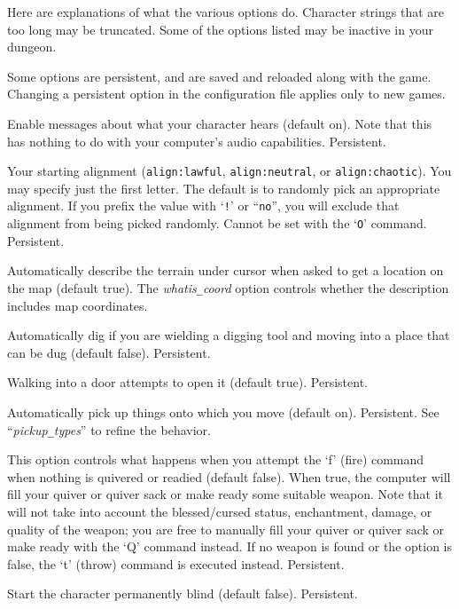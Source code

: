 Here are explanations of what the various options do.
Character strings that are too long may be truncated.
Some of the options listed may be inactive in your dungeon.

Some options are persistent, and are saved and reloaded along with
the game.  Changing a persistent option in the configuration file
applies only to new games.

\blist{}
\item[\ib{acoustics}]
Enable messages about what your character hears (default on).
Note that this has nothing to do with your computer's audio capabilities.
Persistent.
\item[\ib{align}]
Your starting alignment ({\tt align:lawful}, {\tt align:neutral},
or {\tt align:chaotic}).  You may specify just the first letter.
The default is to randomly pick an appropriate alignment.
If you prefix the value with `{\tt !}' or ``{\tt no}'', you will
exclude that alignment from being picked randomly.
Cannot be set with the `{\tt O}' command.  Persistent.
\item[\ib{autodescribe}]
Automatically describe the terrain under cursor when asked to get a location
on the map (default true).
The {\it whatis\verb+_+coord\/}
option controls whether the description includes map coordinates.
\item[\ib{autodig}]
Automatically dig if you are wielding a digging tool and moving into a place
that can be dug (default false).  Persistent.
\item[\ib{autoopen}]
Walking into a door attempts to open it (default true).  Persistent.
\item[\ib{autopickup}]
Automatically pick up things onto which you move (default on).  Persistent.
See ``{\it pickup\verb+_+types\/}'' to refine the behavior.
\item[\ib{autoquiver}]
This option controls what happens when you attempt the `f' (fire)
command when nothing is quivered or readied (default false).
When true, the computer will fill
your quiver or quiver sack or make ready some suitable weapon.
Note that it will not take
into account the blessed/cursed status, enchantment, damage, or
quality of the weapon; you are free to manually fill your quiver
or quiver sack or make ready
with the `Q' command instead.
If no weapon is found or the option is
false, the `t' (throw) command is executed instead.  Persistent.
\item[\ib{blind}]
Start the character permanently blind (default false).  Persistent.
